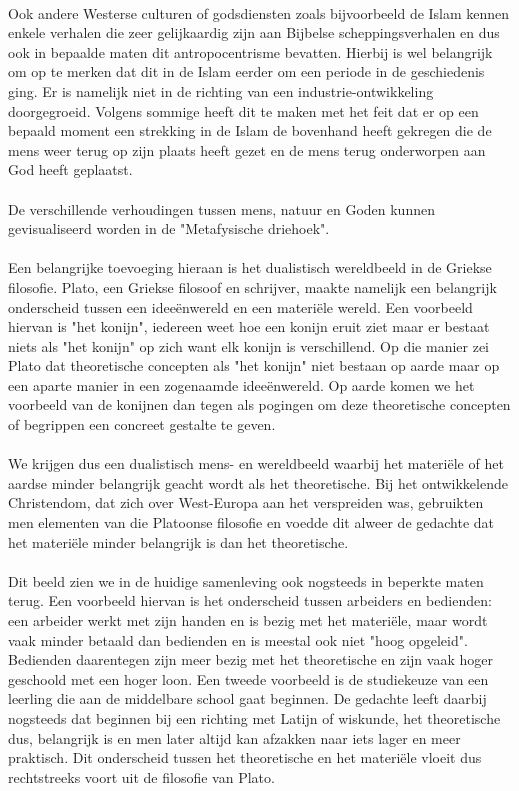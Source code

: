 \documentclass[../summary.tex]{subfiles}
\begin{document}
	\\
	Ook andere Westerse culturen of godsdiensten zoals bijvoorbeeld de Islam kennen enkele verhalen die zeer gelijkaardig zijn aan Bijbelse scheppingsverhalen en dus ook  in bepaalde maten dit antropocentrisme bevatten. Hierbij is wel belangrijk om op te merken dat dit in de Islam eerder om een periode in de geschiedenis ging. Er is namelijk niet in de richting van een industrie-ontwikkeling doorgegroeid. Volgens sommige heeft dit te maken met het feit dat er op een bepaald moment een strekking in de Islam de bovenhand heeft gekregen die de mens weer terug op zijn plaats heeft gezet en de mens terug onderworpen aan God heeft geplaatst.\\
	\\
	De verschillende verhoudingen tussen mens, natuur en Goden kunnen gevisualiseerd worden in de "Metafysische driehoek".\\
	\\
	Een belangrijke toevoeging hieraan is het dualistisch wereldbeeld in de Griekse filosofie. Plato, een Griekse filosoof en schrijver, maakte namelijk een belangrijk onderscheid tussen een ideeënwereld en een materiële wereld. Een voorbeeld hiervan is "het konijn", iedereen weet hoe een konijn eruit ziet maar er bestaat niets als "het konijn" op zich want elk konijn is verschillend. Op die manier zei Plato dat theoretische concepten als "het konijn" niet bestaan op aarde maar op een aparte manier in een zogenaamde ideeënwereld. Op aarde komen we het voorbeeld van de konijnen dan tegen als pogingen om deze theoretische concepten of begrippen een concreet gestalte te geven.\\
	\\
	We krijgen dus een dualistisch mens- en wereldbeeld waarbij het materiële of het aardse minder belangrijk geacht wordt als het theoretische. Bij het ontwikkelende Christendom, dat zich over West-Europa aan het verspreiden was, gebruikten men elementen van die Platoonse filosofie en voedde dit alweer de gedachte dat het materiële minder belangrijk is dan het theoretische.\\
	\\
	Dit beeld zien we in de huidige samenleving ook nogsteeds in beperkte maten terug. Een voorbeeld hiervan is het onderscheid tussen arbeiders en bedienden: een arbeider werkt met zijn handen en is bezig met het materiële, maar wordt vaak minder betaald dan bedienden en is meestal ook niet "hoog opgeleid". Bedienden daarentegen zijn meer bezig met het theoretische en zijn vaak hoger geschoold met een hoger loon. Een tweede voorbeeld is de studiekeuze van een leerling die aan de middelbare school gaat beginnen. De gedachte leeft daarbij nogsteeds dat beginnen bij een richting met Latijn of wiskunde, het theoretische dus, belangrijk is en men later altijd kan afzakken naar iets lager en meer praktisch. Dit onderscheid tussen het theoretische en het materiële vloeit dus rechtstreeks voort uit de filosofie van Plato.\\
\end{document}

